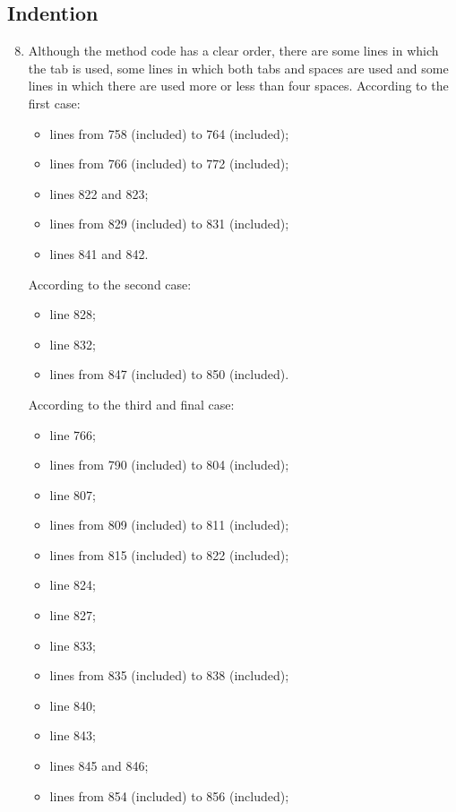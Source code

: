 \subsection{Indention}
\begin{enumerate}
	\setcounter{enumi}{7}
	\item Although the method code has a clear order, there are some lines in which the tab is used, some lines in which both tabs and spaces are used and some lines in which there are used more or less than four spaces. According to the first case:
	    \begin{itemize}
	        \item lines from 758 (included) to 764 (included);
	        \item lines from 766 (included) to 772 (included);
	        \item lines 822 and 823;
	        \item lines from 829 (included) to 831 (included);
	        \item lines 841 and 842.
	    \end{itemize}
	According to the second case:
	    \begin{itemize}
	        \item line 828;
	        \item line 832;
	        \item lines from 847 (included) to 850 (included).
	    \end{itemize}
	According to the third and final case:
	    \begin{itemize}
	        \item line 766;
	        \item lines from 790 (included) to 804 (included);
	        \item line 807;
	        \item lines from 809 (included) to 811 (included);
	        \item lines from 815 (included) to 822 (included);
	        \item line 824;
	        \item line 827;
		    \item line 833;
		    \item lines from 835 (included) to 838 (included);
		    \item line 840;
		    \item line 843;
		    \item lines 845 and 846;
		    \item lines from 854 (included) to 856 (included);

\end{itemize}
\end{enumerate}
